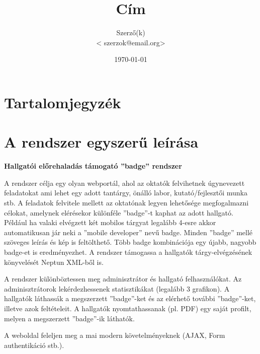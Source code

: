 \documentclass[a4paper,10pt,titlepage]{article}
\makeatletter
\newcommand{\szerzo}{Szerző(k)}
\newcommand{\szerzomail}{szerzok@email.org}
\newcommand{\cim}{Cím}
\makeatother
\begin{document}


\begin{titlepage}

\title{\cim}
\author{\szerzo \\ < \szerzomail >}
\date{\today}

\end{titlepage}
\maketitle

\section*{Tartalomjegyzék}
\makeatletter
{}
\makeatother

\newpage

\section{A rendszer egyszerű leírása}

\begin{center}
\textbf{Hallgatói előrehaladás támogató ''badge'' rendszer}
\end{center}

A rendszer célja egy olyan webportál, ahol az oktatók felvihetnek úgynevezett feladatokat ami lehet egy adott tantárgy, önálló labor, kutató/fejlesztői munka stb. A feladatok felvitele mellett az oktatónak legyen lehetősége megfogalmazni célokat, amelynek elérésekor különféle ''badge''-t kaphat az adott hallgató. Például ha valaki elvégzett két mobilos tárgyat legalább 4-esre akkor automatikusan jár neki a ''mobile developer'' nevű badge. Minden ''badge'' mellé szöveges leírás és kép is feltölthető. Több badge kombinációja egy újabb, nagyobb badge-et is eredményezhet. A rendszer támogassa a hallgatók tárgy-elvégzésének könyvelését Neptun XML-ből is.

A rendszer különböztessen meg adminisztrátor és hallgató felhasználókat. Az adminisztrátorok lekérdezhessenek statisztikákat (legalább 3 grafikon). A hallgatók láthassák a megszerzett ''badge''-ket és az elérhető további ''badge''-ket, illetve azok feltételeit. A hallgatók nyomtathassanak (pl. PDF) egy saját profilt, melyen a megszerzett ''badge''-ik láthatók.

A weboldal feleljen meg a mai modern követelményeknek (AJAX, Form authentikáció stb.).
\end{document}
